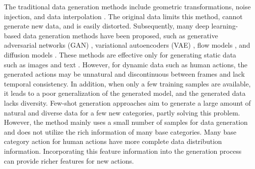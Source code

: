 The traditional data generation methods include geometric transformations, noise injection, and data interpolation \cite{shorten2019survey,he2019parametric}. The original data limits this method, cannot generate new data, and is easily distorted. 
Subsequently, many deep learning-based data generation methods have been proposed, such as generative adversarial networks (GAN) \cite{choi2018stargan,choi2020stargan,karras2019style,karras2020analyzing,wang2018unregularized}, variational autoencoders (VAE) \cite{kingma2013auto,lopez2018information,lopez2020decision}, flow models \cite{rezende2015variational,kingma2018glow}, and diffusion models \cite{ho2020denoising,liu2022compositional,zhang2023inversion}. 
These methods are effective only for generating static data such as images and text \cite{liu2019wasserstein, radford2015unsupervised, mao2017least}. However, for dynamic data such as human actions, the generated actions may be unnatural and discontinuous between frames and lack temporal consistency. 
In addition, when only a few training samples are available, it leads to a poor generalization of the generated model, and the generated data lacks diversity.
Few-shot generation approaches \cite{antoniou2017data,hong2022deltagan,clouatre2019figr,hong2020matchinggan,hong2020f2gan,finn2017model,nichol2018reptile} aim to generate a large amount of natural and diverse data for a few new categories, partly solving this problem. 
However, the method mainly uses a small number of samples for data generation and does not utilize the rich information of many base categories. Many base category action for human actions have more complete data distribution information. Incorporating this feature information into the generation process can provide richer features for new actions.


